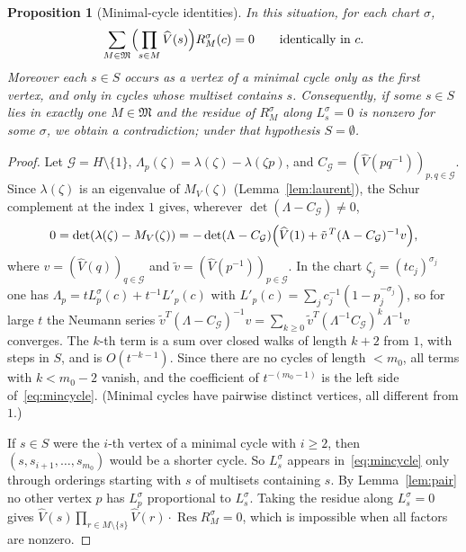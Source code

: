 \documentclass[11pt,reqno]{amsart}
\newtheorem{proposition}[theorem]{Proposition}
\theoremstyle{definition}
\theoremstyle{remark}
\newcommand{\cG}{\mathcal G}
\begin{document}
\begin{proposition}[Minimal-cycle identities]\label{prop:mincycle}
In this situation, for each chart $\sigma$,
\begin{equation}\label{eq:mincycle}
 \sum_{M\in\mathfrak M}\Bigl(\prod_{s\in M}\widehat V(s)\Bigr)R^\sigma_M(c)=0
 \qquad\text{identically in }c .
\end{equation}
Moreover each $s\in S$ occurs as a vertex of a minimal cycle only as the first
vertex, and only in cycles whose multiset contains $s$.  Consequently, if some
$s\in S$ lies in exactly one $M\in\mathfrak M$ and the residue of $R^\sigma_M$
along $L^\sigma_s=0$ is nonzero for some $\sigma$, we obtain a contradiction;
under that hypothesis $S=\emptyset$.
\end{proposition}

\begin{proof}
Let $\cG=H\setminus\{1\}$, $\Lambda_p(\zeta)=\lambda(\zeta)-\lambda(\zeta p)$, and
$C_{\cG}=(\widehat V(pq^{-1}))_{p,q\in\cG}$.  Since $\lambda(\zeta)$ is an
eigenvalue of $M_V(\zeta)$ (Lemma~\ref{lem:laurent}), the Schur complement at the
index $1$ gives, wherever $\det(\Lambda-C_{\cG})\ne0$,
\[
 0=\det(\lambda(\zeta)-M_V(\zeta))=-\det(\Lambda-C_{\cG})\Bigl(\widehat V(1)+\tilde v^{\,T}(\Lambda-C_{\cG})^{-1}v\Bigr),
\]
where $v=(\widehat V(q))_{q\in\cG}$ and $\tilde v=(\widehat V(p^{-1}))_{p\in\cG}$.  In
the chart $\zeta_j=(tc_j)^{\sigma_j}$ one has
$\Lambda_p=tL^\sigma_p(c)+t^{-1}L'_p(c)$ with $L'_p(c)=\sum_jc_j^{-1}(1-p_j^{-\sigma_j})$,
so for large $t$ the Neumann series
$\tilde v^T(\Lambda-C_{\cG})^{-1}v=\sum_{k\ge0}\tilde v^T(\Lambda^{-1}C_{\cG})^k\Lambda^{-1}v$
converges.  The $k$-th term is a sum over closed walks of length $k+2$ from
$1$, with steps in $S$, and is $O(t^{-k-1})$.  Since there are no cycles of
length $<m_0$, all terms with $k<m_0-2$ vanish, and the coefficient of
$t^{-(m_0-1)}$ is the left side of~\eqref{eq:mincycle}.  (Minimal cycles have
pairwise distinct vertices, all different from $1$.)

If $s\in S$ were the $i$-th vertex of a minimal cycle with $i\ge2$, then
$(s,s_{i+1},\dots,s_{m_0})$ would be a shorter cycle.  So $L^\sigma_s$ appears
in~\eqref{eq:mincycle} only through orderings starting with $s$ of multisets
containing $s$.  By Lemma~\ref{lem:pair} no other vertex $p$ has $L^\sigma_p$
proportional to $L^\sigma_s$.  Taking the residue along $L^\sigma_s=0$ gives
$\widehat V(s)\prod_{r\in M\setminus\{s\}}\widehat V(r)\cdot\operatorname{Res}R^\sigma_M=0$,
which is impossible when all factors are nonzero.
\end{proof}
\end{document}
